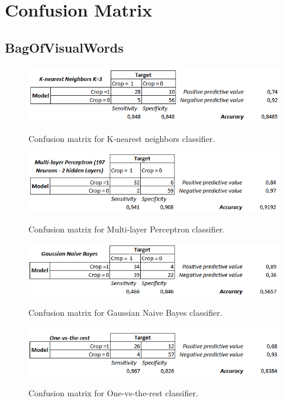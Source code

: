 \documentclass[12pt]{article}
\numberwithin{equation}{section}
\numberwithin{table}{section}
\numberwithin{figure}{section}
\begin{document}
\section{Confusion Matrix} \label{cmatrix}

\subsection{BagOfVisualWords}

\begin{figure}[H] \centering
	\caption{Confusion matrix for K-nearest neighbors classifier. }
	\includegraphics[width=1\textwidth]{m1.png}
	\label{m1}
\end{figure}

\begin{figure}[H] \centering
	\caption{Confusion matrix for Multi-layer Perceptron classifier. }
	\includegraphics[width=1\textwidth]{m2.png}
	\label{m2}
\end{figure}

\begin{figure}[H] \centering
	\caption{Confusion matrix for Gaussian Naive Bayes classifier. }
	\includegraphics[width=1\textwidth]{m3.png}
	\label{m3}
\end{figure}

\begin{figure}[H] \centering
	\caption{Confusion matrix for One-vs-the-rest classifier. }
	\includegraphics[width=1\textwidth]{m4.png}
	\label{m4}
\end{figure}
\end{document}
